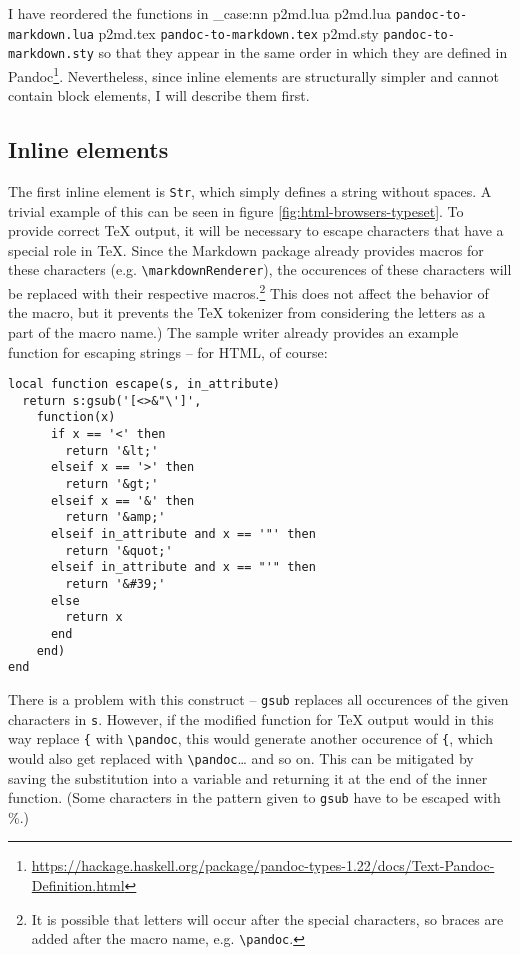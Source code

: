\documentclass[
  digital,     %
  oneside,     %
  nosansbold,  %
  nocolorbold, %
  lof,         %
  nolot,       %
]{fithesis4}
\newcommand\macro[1]{\texttt{\textbackslash{}{#1}}}
\newcommand\pandoc[1]{\macro{pandoc\-{#1}}}
\newcommand\renderer[1]{\macro{markdown\-Renderer\-{#1}}}
\newcommand\file[1]
  {
    \str_case:nn
      { #1 }
      {
        { p2md.lua } { \texttt{pandoc\hyp{}to\hyp{}markdown.lua} }
        { p2md.tex } { \texttt{pandoc\hyp{}to\hyp{}markdown.tex} }
        { p2md.sty } { \texttt{pandoc\hyp{}to\hyp{}markdown.sty} }
      }
  }
\begin{document}
I have reordered the functions in \file{p2md.lua} so that they appear in the same order in which they are defined in Pandoc\footnote{\url{https://hackage.haskell.org/package/pandoc-types-1.22/docs/Text-Pandoc-Definition.html}}. Nevertheless, since inline elements are structurally simpler and cannot contain block elements, I will describe them first.

\subsection{Inline elements}

The first inline element is \texttt{Str}, which simply defines a string without spaces. A trivial example of this can be seen in figure \ref{fig:html-browsers-typeset}. To provide correct \TeX{} output, it will be necessary to escape characters that have a special role in \TeX{}. Since the Markdown package already provides macros for these characters (e.g. \renderer{Backslash}), the occurences of these characters will be replaced with their respective macros.\footnote{It is possible that letters will occur after the special characters, so braces are added after the macro name, e.g. \pandoc{Backslash\{\}}.} This does not affect the behavior of the macro, but it prevents the \TeX{} tokenizer from considering the letters as a part of the macro name.) The sample writer already provides an example function for escaping strings -- for HTML, of course:

\noindent
\lstset{language=[5.3]Lua}
\begin{lstlisting}
local function escape(s, in_attribute)
  return s:gsub('[<>&"\']',
    function(x)
      if x == '<' then
        return '&lt;'
      elseif x == '>' then
        return '&gt;'
      elseif x == '&' then
        return '&amp;'
      elseif in_attribute and x == '"' then
        return '&quot;'
      elseif in_attribute and x == "'" then
        return '&#39;'
      else
        return x
      end
    end)
end
\end{lstlisting}

\noindent
There is a problem with this construct -- \texttt{gsub} replaces all occurences of the given characters in \texttt{s}. However, if the modified function for \TeX{} output would in this way replace \texttt{\{} with \pandoc{LeftBrace\{\}}, this would generate another occurence of \texttt{\{}, which would also get replaced with \pandoc{LeftBrace\{\}}\dots{} and so on. This can be mitigated by saving the substitution into a variable and returning it at the end of the inner function. (Some characters in the pattern given to \texttt{gsub} have to be escaped with \%.)
\end{document}
